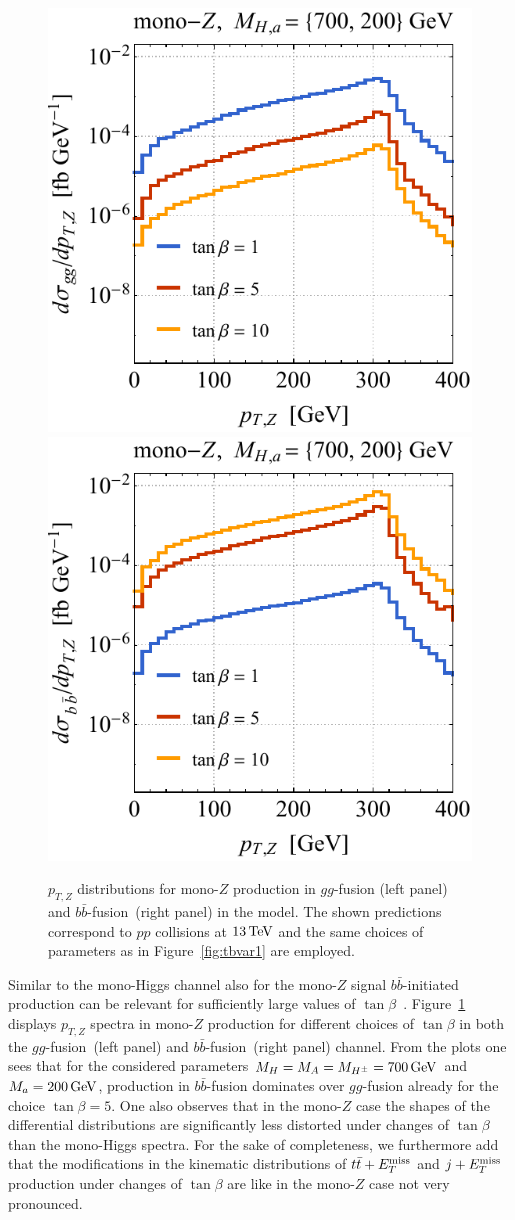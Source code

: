 \begin{figure}[t!]
\centering
\includegraphics[height=0.45\textwidth]{texinputs/04_grid/newfigures/tblz.pdf} \qquad 
\includegraphics[height=0.45\textwidth]{texinputs/04_grid/newfigures/tbrz.pdf}
\vspace{2mm}
\vspace{2mm}
\caption{\label{fig:tbvar2} 
\color{red} $p_{T,Z}$ distributions for mono-$Z$ production in $gg$-fusion (left panel) and $b \bar b$-fusion~(right panel) in the \hdma model. The shown predictions correspond to $pp$ collisions at $13 \, {\rm TeV}$ and the same choices of parameters as in Figure~\ref{fig:tbvar1} are employed.}
\end{figure}

{\color{red} Similar to the mono-Higgs channel also for the mono-$Z$ signal $b \bar b$-initiated production can be relevant for sufficiently large values of $\tan \beta$~\cite{Bauer:2017ota}. Figure~\ref{fig:tbvar2} displays $p_{T,Z}$ spectra in mono-$Z$ production for different choices of $\tan \beta$ in both the $gg$-fusion~(left panel) and $b \bar b$-fusion~(right panel) channel.  From the plots one sees that for the considered parameters $M_{H} = M_{A} = M_{H^{\pm}} = 700 \, {\rm GeV}$ and $M_{a} = 200 \, {\rm GeV}$,  production in $b \bar b$-fusion dominates over $gg$-fusion already for the choice $\tan \beta = 5$. One also observes that  in the mono-$Z$ case   the shapes of the differential distributions are significantly less distorted under changes of $\tan \beta$ than the mono-Higgs spectra. For the sake of completeness, we furthermore  add that the modifications in the kinematic distributions of $t \bar t + E_T^\mathrm{miss}$ and $j +E_T^\mathrm{miss}$ production under changes of $\tan \beta$ are like in the mono-$Z$ case not very pronounced.} 

